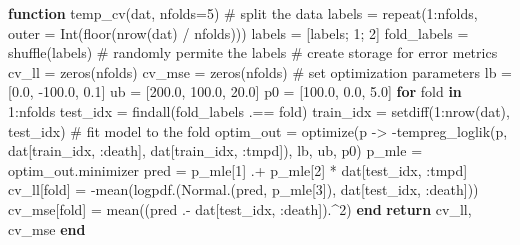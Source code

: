 \documentclass[
  letterpaper,
  DIV=11,
  numbers=noendperiod]{scrartcl}
\newenvironment{Shaded}{\begin{snugshade}}{\end{snugshade}}
\newcommand{\CommentTok}[1]{\textcolor[rgb]{0.37,0.37,0.37}{#1}}
\newcommand{\ControlFlowTok}[1]{\textcolor[rgb]{0.00,0.23,0.31}{\textbf{#1}}}
\newcommand{\FloatTok}[1]{\textcolor[rgb]{0.68,0.00,0.00}{#1}}
\newcommand{\FunctionTok}[1]{\textcolor[rgb]{0.28,0.35,0.67}{#1}}
\newcommand{\KeywordTok}[1]{\textcolor[rgb]{0.00,0.23,0.31}{\textbf{#1}}}
\newcommand{\NormalTok}[1]{\textcolor[rgb]{0.00,0.23,0.31}{#1}}
\newcommand{\OperatorTok}[1]{\textcolor[rgb]{0.37,0.37,0.37}{#1}}
\newcommand*\circled[1]{\tikz[baseline=(char.base)]{
          \node[shape=circle,draw,inner sep=1pt] (char) {{\scriptsize#1}};}}
\begin{document}
\begin{Shaded}
\begin{Highlighting}[]
\KeywordTok{function} \FunctionTok{temp\_cv}\NormalTok{(dat, nfolds}\OperatorTok{=}\FloatTok{5}\NormalTok{)}
    \CommentTok{\# split the data}
\NormalTok{    labels }\OperatorTok{=} \FunctionTok{repeat}\NormalTok{(}\FloatTok{1}\OperatorTok{:}\NormalTok{nfolds, outer }\OperatorTok{=} \FunctionTok{Int}\NormalTok{(}\FunctionTok{floor}\NormalTok{(}\FunctionTok{nrow}\NormalTok{(dat) }\OperatorTok{/}\NormalTok{ nfolds))) }\hspace*{\fill}\NormalTok{\circled{1}}
\NormalTok{    labels }\OperatorTok{=}\NormalTok{ [labels; }\FloatTok{1}\NormalTok{; }\FloatTok{2}\NormalTok{] }
\NormalTok{    fold\_labels }\OperatorTok{=} \FunctionTok{shuffle}\NormalTok{(labels) }\CommentTok{\# randomly permite the labels}
    \CommentTok{\# create storage for error metrics}
\NormalTok{    cv\_ll }\OperatorTok{=} \FunctionTok{zeros}\NormalTok{(nfolds)}
\NormalTok{    cv\_mse }\OperatorTok{=} \FunctionTok{zeros}\NormalTok{(nfolds)}
    \CommentTok{\# set optimization parameters}
\NormalTok{    lb }\OperatorTok{=}\NormalTok{ [}\FloatTok{0.0}\NormalTok{, }\OperatorTok{{-}}\FloatTok{100.0}\NormalTok{, }\FloatTok{0.1}\NormalTok{]}
\NormalTok{    ub }\OperatorTok{=}\NormalTok{ [}\FloatTok{200.0}\NormalTok{, }\FloatTok{100.0}\NormalTok{, }\FloatTok{20.0}\NormalTok{]}
\NormalTok{    p0 }\OperatorTok{=}\NormalTok{ [}\FloatTok{100.0}\NormalTok{, }\FloatTok{0.0}\NormalTok{, }\FloatTok{5.0}\NormalTok{]}
    \ControlFlowTok{for}\NormalTok{ fold }\KeywordTok{in} \FloatTok{1}\OperatorTok{:}\NormalTok{nfolds}
\NormalTok{        test\_idx }\OperatorTok{=} \FunctionTok{findall}\NormalTok{(fold\_labels }\OperatorTok{.==}\NormalTok{ fold)}
\NormalTok{        train\_idx }\OperatorTok{=} \FunctionTok{setdiff}\NormalTok{(}\FloatTok{1}\OperatorTok{:}\FunctionTok{nrow}\NormalTok{(dat), test\_idx)}
        \CommentTok{\# fit model to the fold}
\NormalTok{        optim\_out }\OperatorTok{=} \FunctionTok{optimize}\NormalTok{(p }\OperatorTok{{-}\textgreater{}} \FunctionTok{{-}tempreg\_loglik}\NormalTok{(p, dat[train\_idx, }\OperatorTok{:}\NormalTok{death], dat[train\_idx, }\OperatorTok{:}\NormalTok{tmpd]), lb, ub, p0)}
\NormalTok{        p\_mle }\OperatorTok{=}\NormalTok{ optim\_out.minimizer}
\NormalTok{        pred }\OperatorTok{=}\NormalTok{ p\_mle[}\FloatTok{1}\NormalTok{] }\OperatorTok{.+}\NormalTok{ p\_mle[}\FloatTok{2}\NormalTok{] }\OperatorTok{*}\NormalTok{ dat[test\_idx, }\OperatorTok{:}\NormalTok{tmpd]}
\NormalTok{        cv\_ll[fold] }\OperatorTok{=} \FunctionTok{{-}mean}\NormalTok{(}\FunctionTok{logpdf}\NormalTok{.(}\FunctionTok{Normal}\NormalTok{.(pred, p\_mle[}\FloatTok{3}\NormalTok{]), dat[test\_idx, }\OperatorTok{:}\NormalTok{death])) }\hspace*{\fill}\NormalTok{\circled{2}}
\NormalTok{        cv\_mse[fold] }\OperatorTok{=} \FunctionTok{mean}\NormalTok{((pred }\OperatorTok{.{-}}\NormalTok{ dat[test\_idx, }\OperatorTok{:}\NormalTok{death])}\OperatorTok{.\^{}}\FloatTok{2}\NormalTok{)}
    \ControlFlowTok{end}
    \ControlFlowTok{return}\NormalTok{ cv\_ll, cv\_mse}
\KeywordTok{end}


\end{Highlighting}
\end{Shaded}
\end{document}
